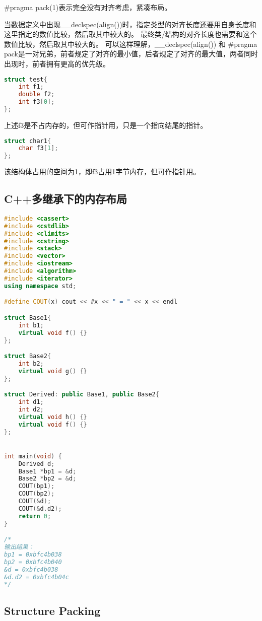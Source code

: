 \#pragma pack(1)表示完全没有对齐考虑，紧凑布局。

当数据定义中出现\__declspec(align())时，指定类型的对齐长度还要用自身长度和这里指定的数值比较，然后取其中较大的。
最终类/结构的对齐长度也需要和这个数值比较，然后取其中较大的。
可以这样理解，\__declspec(align()) 和 \#pragma pack是一对兄弟，前者规定了对齐的最小值，后者规定了对齐的最大值，两者同时出现时，前者拥有更高的优先级。


\begin{lstlisting}[language=C++]
struct test{
    int f1;
    double f2;
    int f3[0];
};
\end{lstlisting}
上述f3是不占内存的，但可作指针用，只是一个指向结尾的指针。

\begin{lstlisting}[language=C++]
struct char1{
    char f3[1];
};
\end{lstlisting}
该结构体占用的空间为1，即f3占用1字节内存，但可作指针用。


\subsection{C++多继承下的内存布局}

\begin{lstlisting}[language=C++]
#include <cassert>
#include <cstdlib>
#include <climits>
#include <cstring>
#include <stack>
#include <vector>
#include <iostream>
#include <algorithm>
#include <iterator>  
using namespace std;

#define COUT(x) cout << #x << " = " << x << endl

struct Base1{
    int b1; 
    virtual void f() {}
};

struct Base2{
    int b2; 
    virtual void g() {}
};

struct Derived: public Base1, public Base2{
    int d1; 
    int d2; 
    virtual void h() {}
    virtual void f() {}
};


int main(void) {
    Derived d;
    Base1 *bp1 = &d; 
    Base2 *bp2 = &d; 
    COUT(bp1);
    COUT(bp2);
    COUT(&d);
    COUT(&d.d2);
    return 0;
}

/*
输出结果：
bp1 = 0xbfc4b038
bp2 = 0xbfc4b040
&d = 0xbfc4b038
&d.d2 = 0xbfc4b04c
*/      
\end{lstlisting}


\subsection{Structure Packing}


